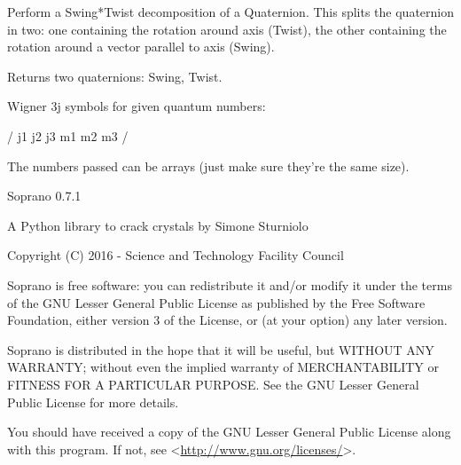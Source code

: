 \documentclass[letterpaper,10pt,english]{sphinxmanual}
\begin{document}
\begin{fulllineitems}
\label{doctree/soprano.utils:soprano.utils.swing_twist_decomp}
Perform a Swing*Twist decomposition of a Quaternion. This splits the
quaternion in two: one containing the rotation around axis (Twist), the
other containing the rotation around a vector parallel to axis (Swing).

Returns two quaternions: Swing, Twist.

\end{fulllineitems}


\begin{fulllineitems}
\label{doctree/soprano.utils:soprano.utils.wigner_3j}
Wigner 3j symbols for given quantum numbers:

/                     \textbar{} j1    j2     j3 \textbar{}
\textbar{} m1    m2     m3 \textbar{}
                /

The numbers passed can be arrays (just make sure they're the
same size).

\end{fulllineitems}

\label{index:module-soprano}
Soprano 0.7.1

A Python library to crack crystals
by Simone Sturniolo

Copyright (C) 2016 - Science and Technology Facility Council

Soprano is free software: you can redistribute it and/or modify
it under the terms of the GNU Lesser General Public License as published by
the Free Software Foundation, either version 3 of the License, or
(at your option) any later version.

Soprano is distributed in the hope that it will be useful,
but WITHOUT ANY WARRANTY; without even the implied warranty of
MERCHANTABILITY or FITNESS FOR A PARTICULAR PURPOSE.  See the
GNU Lesser General Public License for more details.

You should have received a copy of the GNU Lesser General Public License
along with this program.  If not, see \textless{}\url{http://www.gnu.org/licenses/}\textgreater{}.
\end{document}
